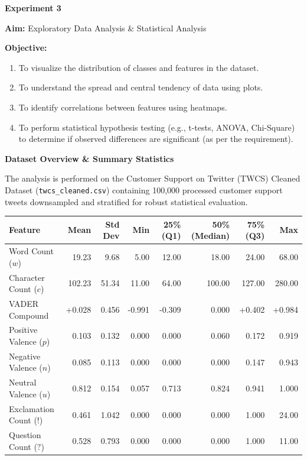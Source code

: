 \documentclass[12pt]{article}
\begin{document}
\begin{center}
    {\Large \textbf{Experiment 3}}
\end{center}

\vspace{0.5em}

\noindent \textbf{Aim:} Exploratory Data Analysis \& Statistical Analysis

\vspace{0.8em}

\noindent \textbf{Objective:}
\begin{enumerate}[leftmargin=1.8em]
    \item To visualize the distribution of classes and features in the dataset.
    \item To understand the spread and central tendency of data using plots.
    \item To identify correlations between features using heatmaps.
    \item To perform statistical hypothesis testing (e.g., t-tests, ANOVA, Chi-Square) to determine if observed differences are significant (as per the requirement).
\end{enumerate}

\vspace{0.8em}

\noindent \textbf{Dataset Overview \& Summary Statistics}

\noindent The analysis is performed on the Customer Support on Twitter (TWCS) Cleaned Dataset (\texttt{twcs\_cleaned.csv}) containing 100,000 processed customer support tweets downsampled and stratified for robust statistical evaluation.

\vspace{0.5em}

\begin{table}[h!]
\centering
\small
\begin{tabular}{lrrrrrrr}
\toprule
\textbf{Feature} & \textbf{Mean} & \textbf{Std Dev} & \textbf{Min} & \textbf{25\% (Q1)} & \textbf{50\% (Median)} & \textbf{75\% (Q3)} & \textbf{Max} \\
\midrule
Word Count ($w$)        & 19.23  & 9.68  & 5.00   & 12.00  & 18.00  & 24.00  & 68.00  \\
Character Count ($c$)   & 102.23 & 51.34 & 11.00  & 64.00  & 100.00 & 127.00 & 280.00 \\
VADER Compound          & +0.028 & 0.456 & -0.991 & -0.309 & 0.000  & +0.402 & +0.984 \\
Positive Valence ($p$)  & 0.103  & 0.132 & 0.000  & 0.000  & 0.060  & 0.172  & 0.919  \\
Negative Valence ($n$)  & 0.085  & 0.113 & 0.000  & 0.000  & 0.000  & 0.147  & 0.943  \\
Neutral Valence ($u$)   & 0.812  & 0.154 & 0.057  & 0.713  & 0.824  & 0.941  & 1.000  \\
Exclamation Count ($!$) & 0.461  & 1.042 & 0.000  & 0.000  & 0.000  & 1.000  & 24.00  \\
Question Count ($?$)    & 0.528  & 0.793 & 0.000  & 0.000  & 0.000  & 1.000  & 11.00  \\
\bottomrule
\end{tabular}
\end{table}
\end{document}
